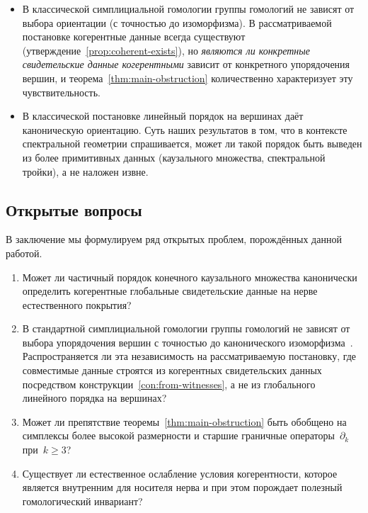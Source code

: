 \documentclass[11pt,a4paper]{article}
\theoremstyle{plain}
\theoremstyle{definition}
\theoremstyle{remark}
\begin{document}
\begin{itemize}[nosep]
  \item В классической симплициальной гомологии группы гомологий
        не зависят от выбора ориентации (с точностью до изоморфизма).
        В рассматриваемой постановке когерентные данные всегда
        существуют (утверждение~\ref{prop:coherent-exists}), но
        \emph{являются ли конкретные свидетельские данные когерентными}
        зависит от конкретного упорядочения вершин, и
        теорема~\ref{thm:main-obstruction} количественно характеризует
        эту чувствительность.

  \item В классической постановке линейный порядок на вершинах
        даёт каноническую ориентацию. Суть наших результатов в том, что
        в контексте спектральной геометрии спрашивается, может ли такой
        порядок быть выведен из более примитивных данных (каузального
        множества, спектральной тройки), а не наложен извне.
\end{itemize}

\subsection{Открытые вопросы}

В заключение мы формулируем ряд открытых проблем, порождённых данной
работой.

\begin{enumerate}[nosep]
  \item Может ли частичный порядок конечного каузального множества
        канонически определить когерентные глобальные свидетельские данные
        на нерве естественного покрытия?
  \item В стандартной симплициальной гомологии группы гомологий
        не зависят от выбора упорядочения вершин с точностью до
        канонического изоморфизма~\cite[раздел~2.1]{Hatcher:2002}.
        Распространяется ли эта независимость на рассматриваемую
        постановку, где совместимые данные строятся из когерентных
        свидетельских данных посредством конструкции~\ref{con:from-witnesses},
        а не из глобального линейного порядка на вершинах?
  \item Может ли препятствие теоремы~\ref{thm:main-obstruction}
        быть обобщено на симплексы более высокой размерности и
        старшие граничные операторы~$\partial_k$ при~$k \geq 3$?
  \item Существует ли естественное ослабление условия когерентности,
        которое является внутренним для носителя нерва и при этом
        порождает полезный гомологический инвариант?
\end{enumerate}
\end{document}
